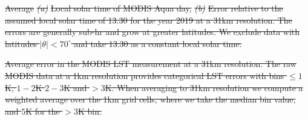 \documentclass[hess, twostagejnl]{copernicus}
\providecommand{\DIFdel}[1]{{\protect\color{red}\sout{#1}}}                      %
\providecommand{\DIFdelbegin}{} %
\providecommand{\DIFdelend}{} %
\providecommand{\DIFdelFL}[1]{\DIFdel{#1}} %
\begin{document}
\DIFdelbegin %
{%
\DIFdelFL{Average }\textit{\DIFdelFL{(a)}} %
\DIFdelFL{Local solar time of MODIS Aqua day, }\textit{\DIFdelFL{(b)}} %
\DIFdelFL{Error relative to the assumed local solar time of 13.30 for the year 2019 at a 31km resolution. The errors are generally sub-hr and grow at greater latitudes. We exclude data with latitudes $|\theta| < 70^{\circ}$ and take 13.30 as a constant local solar time.}} 
\DIFdelend 

\DIFdelbegin %
{%
\DIFdelFL{Average error in the MODIS LST measurement at a 31km resolution. The raw MODIS data at a 1km resolution provides categorical LST errors with bins $\leq 1$K, $1 - 2$K $2-3$K and $>3$K. When averaging to 31km resolution we compute a weighted average over the 1km grid cells, where we take the median bin value, and $5$K for the $>3$K bin.}} 
\end{document}

